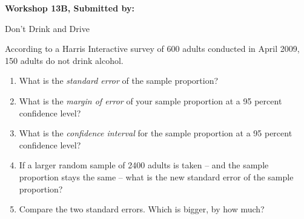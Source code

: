 \documentclass[11pt]{book}\usepackage[]{graphicx}\usepackage[]{color}
\begin{document}
\begin{exercises}
\begin{solution}
\end{solution}

\clearpage

    \begin{exercise}  %


    \begin{center}
\begin{flushleft}\textbf{\large \hfill Workshop 13B, Submitted by: }\end{flushleft}

\end{center}

Don’t Drink and Drive


According to a Harris Interactive survey of 600 adults conducted in April 2009, 150 adults do not drink alcohol.

\begin{enumerate}
\item What is the \textit{standard error} of the sample proportion?
\item What is the \textit{margin of error} of your sample proportion at a 95 percent confidence level?
\item What is the \textit{confidence interval} for the sample proportion at a 95 percent confidence level?
\item If a larger random sample of 2400 adults is taken -- and the sample proportion stays the same -- what is the new standard error of the sample proportion?
\item Compare the two standard errors. Which is bigger, by how much?
\end{enumerate}


\end{exercise}
\begin{solution}  %


\end{solution}
\end{exercises}
\end{document}

